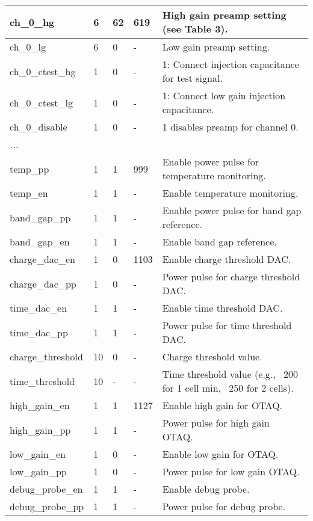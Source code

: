 \begin{longtable}{|p{6cm}|p{1cm}|p{1.4cm}|p{1.8cm}|p{5cm}|}
ch\_0\_hg                  & 6  & 62 & 619 & High gain preamp setting (see Table 3). \\ \hline
ch\_0\_lg                  & 6  & 0  & -   & Low gain preamp setting. \\ \hline
ch\_0\_ctest\_hg            & 1  & 0  & -   & 1: Connect injection capacitance for test signal. \\ \hline
ch\_0\_ctest\_lg            & 1  & 0  & -   & 1: Connect low gain injection capacitance. \\ \hline
ch\_0\_disable             & 1  & 0  & -   & 1 disables preamp for channel 0. \\ \hline
\multicolumn{5}{|l|}{\emph{...}} \\ \hline

temp\_pp                  & 1  & 1 & 999   & Enable power pulse for temperature monitoring. \\ \hline
temp\_en                  & 1  & 1 & -   & Enable temperature monitoring. \\ \hline
band\_gap\_pp              & 1  & 1 & -   & Enable power pulse for band gap reference. \\ \hline
band\_gap\_en              & 1  & 1 & -   & Enable band gap reference. \\ \hline

charge\_dac\_en            & 1  & 0 & 1103 & Enable charge threshold DAC. \\ \hline
charge\_dac\_pp            & 1  & 0 & -   & Power pulse for charge threshold DAC. \\ \hline
time\_dac\_en              & 1  & 1 & -   & Enable time threshold DAC. \\ \hline
time\_dac\_pp              & 1  & 1 & -   & Power pulse for time threshold DAC. \\ \hline
charge\_threshold         & 10 & 0 & -   & Charge threshold value. \\ \hline
time\_threshold           & 10 & - & -   & Time threshold value (e.g., ~200 for 1 cell min, ~250 for 2 cells). \\ \hline

high\_gain\_en             & 1  & 1 & 1127 & Enable high gain for OTAQ. \\ \hline
high\_gain\_pp             & 1  & 1 & -    & Power pulse for high gain OTAQ. \\ \hline
low\_gain\_en              & 1  & 0 & -    & Enable low gain for OTAQ. \\ \hline
low\_gain\_pp              & 1  & 0 & -    & Power pulse for low gain OTAQ. \\ \hline
debug\_probe\_en           & 1  & 1 & -    & Enable debug probe. \\ \hline
debug\_probe\_pp           & 1  & 1 & -    & Power pulse for debug probe. \\ \hline


\end{longtable}
